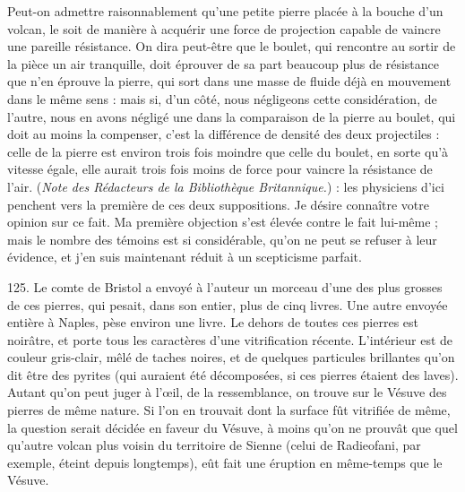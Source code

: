 \documentclass[a4paper, 11pt, oneside, polutonikogreek, french]{article}
\begin{document}
{{\hspace*{5mm}Peut-on admettre raisonnablement qu'une petite pierre placée à la bouche d'un volcan, le soit de manière à acquérir une force de projection capable de vaincre une pareille résistance. On dira peut-être que le boulet, qui rencontre au sortir de la pièce un air tranquille, doit éprouver de sa part beaucoup plus de résistance que n'en éprouve la pierre, qui sort dans une masse de fluide déjà en mouvement dans le même sens : mais si, d'un côté, nous négligeons cette considération, de l'autre, nous en avons négligé une dans la comparaison de la pierre au boulet, qui doit au moins la compenser, c'est la différence de densité des deux projectiles : celle de la pierre est environ trois fois moindre que celle du boulet, en sorte qu'à vitesse égale, elle aurait trois fois moins de force pour vaincre la résistance de l'air. (\emph{Note des Rédacteurs de la Bibliothèque Britannique.})}} : les physiciens d'ici penchent vers la première de ces deux suppositions. Je désire connaître votre opinion sur ce fait. Ma première objection s'est élevée contre le fait lui-même ; mais le nombre des témoins est si considérable, qu'on ne peut se refuser à leur évidence, et j'en suis maintenant réduit à un scepticisme parfait. \fg
 
125. Le comte de Bristol a envoyé à l'auteur un morceau d'une des plus grosses de ces pierres, qui pesait, dans son entier, plus de cinq livres. Une autre envoyée entière à Naples, pèse environ une livre. Le dehors de toutes ces pierres est noirâtre, et porte tous les caractères d'une vitrification récente. L'intérieur est de couleur gris-clair, mêlé de taches noires, et de quelques particules brillantes qu'on dit être des pyrites (qui auraient été décomposées, si ces pierres étaient des laves). Autant qu'on peut juger à l'œil, de la ressemblance, on trouve sur le Vésuve des pierres de même nature. Si l'on en trouvait dont la surface fût vitrifiée de même, la question serait décidée en faveur du Vésuve, à moins qu'on ne prouvât que quel qu’autre volcan plus voisin du territoire de Sienne (celui de Radieofani, par exemple, éteint depuis longtemps), eût fait une éruption en même-temps que le Vésuve.
\end{document}
